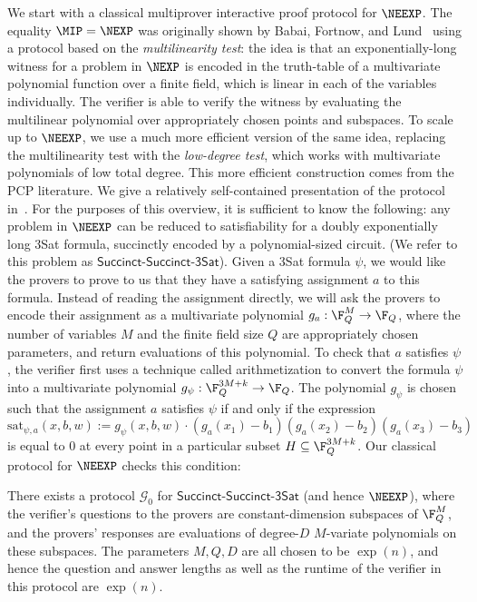 \documentclass[11pt]{article}
\newcommand{\succinctsquared}{\mathsf{Succinct}\text{-}\mathsf{Succinct}\text{-}\mathsf{3Sat}}
\newcommand{\game}{\mathscr{G}}
\begin{document}
We start with a classical multiprover interactive proof protocol for
$\NEEXP$. The equality $\MIP = \NEXP$ was originally shown by Babai,
Fortnow, and Lund~\cite{BFL91} using a protocol based on the \emph{multilinearity
  test}: the idea is that an exponentially-long witness for a problem
in $\NEXP$ is encoded in the truth-table of a multivariate polynomial
function over a finite field, which is linear in each of the variables
individually. The verifier is able to verify the witness
by evaluating the multilinear polynomial over appropriately chosen
points and subspaces. To scale up to $\NEEXP$, we use a much more
efficient version of the same idea, replacing the multilinearity test
with the \emph{low-degree test}, which works with multivariate
polynomials of low total degree. This more efficient construction
comes from the PCP literature. We give a relatively self-contained
presentation of the protocol in~. For the
purposes of this overview, it is sufficient to know the following: any
problem in $\NEEXP$ can be reduced to satisfiability for a doubly exponentially long 3Sat
formula, succinctly encoded by a polynomial-sized circuit. (We refer
to this problem as $\succinctsquared$). Given a 3Sat formula
$\psi$, we would like the provers to prove to us that they have a
satisfying assignment $a$ to this formula. Instead of reading the
assignment directly, we will ask the provers to
encode their assignment as a multivariate polynomial $g_a: \F_Q^M \to
\F_Q$, where the number of variables $M$ and the finite field size $Q$
are appropriately chosen parameters, and return evaluations of this polynomial. To check that $a$
satisfies $\psi$, the verifier first uses a technique called
arithmetization to convert the
formula $\psi$ into a multivariate polynomial $g_{\psi}: \F_Q^{3M + k}
\to \F_Q$. The polynomial $g_{\psi}$ is chosen such that the assignment $a$
satisfies $\psi$ if and only if the expression
\[ \mathrm{sat}_{\psi,a}(x,b, w) := g_{\psi}(x,b,w) \cdot (g_a(x_1)
  -b_1)(g_a(x_2) - b_2)(g_a(x_3) - b_3) \]
is equal to $0$ at every point in a particular subset $H \subseteq \F_Q^{3M
  +k}$. Our classical protocol for $\NEEXP$ checks this condition:
\begin{infthm}
There exists a protocol $\game_0$ for $\mathsf{Succinct}$-$\mathsf{Succinct}$-$\mathsf{3Sat}$ (and hence
$\NEEXP$), where the verifier's questions to the provers are
constant-dimension subspaces of $\F_Q^{M}$, and the provers' responses
are evaluations of degree-$D$ $M$-variate polynomials on these
subspaces. The parameters $M, Q, D$ are all chosen to be $\exp(n)$,
and hence the question and answer lengths as well as the runtime of
the verifier in this protocol are
$\exp(n)$. 
\end{infthm}
\end{document}
